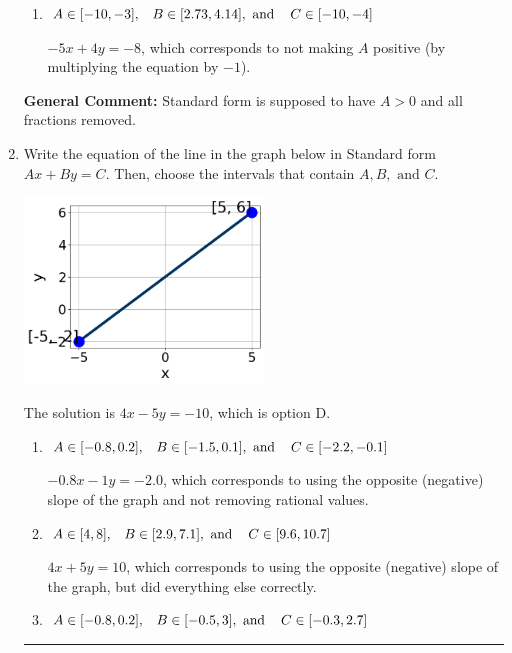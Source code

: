 \documentclass{extbook}[14pt]
\newcommand{\litem}[1]{\item #1

\rule{\textwidth}{0.4pt}}
\begin{document}
\begin{enumerate}
{\begin{enumerate}[label=\Alph*.]
 $-1.25x - 1y = 2.0$, which corresponds to using the opposite (negative) slope of the graph and not removing rational values.
\item \( A \in [-10, -3], \hspace{3mm} B \in [2.73, 4.14], \text{ and } \hspace{3mm} C \in [-10, -4] \)

 $-5x + 4y = -8$, which corresponds to not making $A$ positive (by multiplying the equation by $-1$).
\end{enumerate}

\textbf{General Comment:} Standard form is supposed to have $A > 0$ and all fractions removed.
}
\litem{
Write the equation of the line in the graph below in Standard form $Ax+By=C$. Then, choose the intervals that contain $A, B, \text{ and } C$.

\begin{center}
    \includegraphics[width=0.5\textwidth]{../Figures/linearGraphToStandardC.png}
\end{center}


The solution is \( 4x - 5y = -10 \), which is option D.\begin{enumerate}[label=\Alph*.]
\item \( A \in [-0.8, 0.2], \hspace{3mm} B \in [-1.5, 0.1], \text{ and } \hspace{3mm} C \in [-2.2, -0.1] \)

 $-0.8x - 1y = -2.0$, which corresponds to using the opposite (negative) slope of the graph and not removing rational values.
\item \( A \in [4, 8], \hspace{3mm} B \in [2.9, 7.1], \text{ and } \hspace{3mm} C \in [9.6, 10.7] \)

 $4x + 5y = 10$, which corresponds to using the opposite (negative) slope of the graph, but did everything else correctly.
\item \( A \in [-0.8, 0.2], \hspace{3mm} B \in [-0.5, 3], \text{ and } \hspace{3mm} C \in [-0.3, 2.7] \)


\end{enumerate}}
\end{enumerate}
\end{document}
